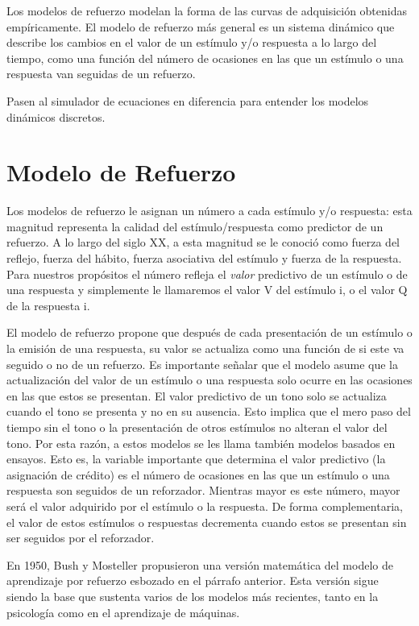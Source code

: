 \documentclass[
  a4paper,
  DIV=11,
  numbers=noendperiod]{scrreprt}
\begin{document}
Los modelos de refuerzo modelan la forma de las curvas de adquisición
obtenidas empíricamente. El modelo de refuerzo más general es un sistema
dinámico que describe los cambios en el valor de un estímulo y/o
respuesta a lo largo del tiempo, como una función del número de
ocasiones en las que un estímulo o una respuesta van seguidas de un
refuerzo.

Pasen al simulador de ecuaciones en diferencia para entender los modelos
dinámicos discretos.

\section{Modelo de Refuerzo}\label{modelo-de-refuerzo}

Los modelos de refuerzo le asignan un número a cada estímulo y/o
respuesta: esta magnitud representa la calidad del estímulo/respuesta
como predictor de un refuerzo. A lo largo del siglo XX, a esta magnitud
se le conoció como fuerza del reflejo, fuerza del hábito, fuerza
asociativa del estímulo y fuerza de la respuesta. Para nuestros
propósitos el número refleja el \emph{valor} predictivo de un estímulo o
de una respuesta y simplemente le llamaremos el valor V del estímulo i,
o el valor Q de la respuesta i.

El modelo de refuerzo propone que después de cada presentación de un
estímulo o la emisión de una respuesta, su valor se actualiza como una
función de si este va seguido o no de un refuerzo. Es importante señalar
que el modelo asume que la actualización del valor de un estímulo o una
respuesta solo ocurre en las ocasiones en las que estos se presentan. El
valor predictivo de un tono solo se actualiza cuando el tono se presenta
y no en su ausencia. Esto implica que el mero paso del tiempo sin el
tono o la presentación de otros estímulos no alteran el valor del tono.
Por esta razón, a estos modelos se les llama también modelos basados en
ensayos. Esto es, la variable importante que determina el valor
predictivo (la asignación de crédito) es el número de ocasiones en las
que un estímulo o una respuesta son seguidos de un reforzador. Mientras
mayor es este número, mayor será el valor adquirido por el estímulo o la
respuesta. De forma complementaria, el valor de estos estímulos o
respuestas decrementa cuando estos se presentan sin ser seguidos por el
reforzador.

En 1950, Bush y Mosteller propusieron una versión matemática del modelo
de aprendizaje por refuerzo esbozado en el párrafo anterior. Esta
versión sigue siendo la base que sustenta varios de los modelos más
recientes, tanto en la psicología como en el aprendizaje de máquinas.
\end{document}
